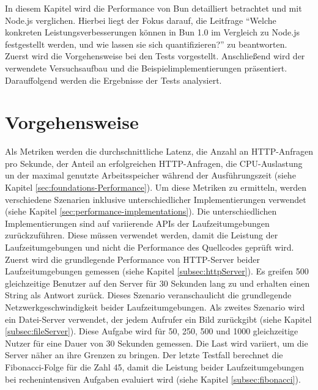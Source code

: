   \label{performanceAnalysis}
In diesem Kapitel wird die Performance von Bun detailliert betrachtet und mit Node.js verglichen. Hierbei liegt der Fokus darauf, die Leitfrage ``Welche konkreten Leistungsverbesserungen können in Bun 1.0 im Vergleich zu Node.js festgestellt werden, und wie lassen sie sich quantifizieren?'' zu beantworten. Zuerst wird die Vorgehensweise bei den Tests vorgestellt. Anschließend wird der verwendete Versuchsaufbau und die Beispielimplementierungen präsentiert. Darauffolgend werden die Ergebnisse der Tests analysiert.


\section{Vorgehensweise} \label{sec:performance-approach}
Als Metriken werden die durchschnittliche Latenz, die Anzahl an HTTP-Anfragen pro Sekunde, der Anteil an erfolgreichen HTTP-Anfragen, die CPU-Auslastung un der maximal genutzte Arbeitsspeicher während der Ausführungszeit (siehe Kapitel \ref{sec:foundations-Performance}). Um diese Metriken zu ermitteln, werden verschiedene Szenarien inklusive unterschiedlicher Implementierungen verwendet (siehe Kapitel \ref{sec:performance-implementations}). Die unterschiedlichen Implementierungen sind auf variierende APIs  der Laufzeitumgebungen zurückzuführen. Diese müssen verwendet werden, damit die Leistung der Laufzeitumgebungen und nicht die Performance des Quellcodes geprüft wird.\\

\noindent
Zuerst wird die grundlegende Performance von HTTP-Server beider Laufzeitumgebungen gemessen (siehe Kapitel \ref{subsec:httpServer}). Es greifen 500 gleichzeitige Benutzer auf den Server für 30 Sekunden lang zu und erhalten einen String als Antwort zurück. Dieses Szenario veranschaulicht die grundlegende Netzwerkgeschwindigkeit beider Laufzeitumgebungen. Als zweites Szenario wird ein Datei-Server verwendet, der jedem Aufrufer ein Bild zurückgibt (siehe Kapitel \ref{subsec:fileServer}). Diese Aufgabe wird für 50, 250, 500 und 1000 gleichzeitige Nutzer für eine Dauer von 30 Sekunden gemessen. Die Last wird variiert, um die Server näher an ihre Grenzen zu bringen. Der letzte Testfall berechnet die Fibonacci-Folge für die Zahl 45, damit die Leistung beider Laufzeitumgebungen bei rechenintensiven Aufgaben evaluiert wird (siehe Kapitel \ref{subsec:fibonacci}).

